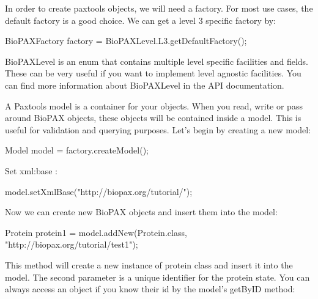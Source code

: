 \documentclass{tufte-book}
\begin{document}
In order to create paxtools objects, we will need a factory. For most use cases, the default factory is a good choice. We can get a level 3 specific factory by:

\begin{javacode}
BioPAXFactory factory = BioPAXLevel.L3.getDefaultFactory();
\end{javacode}

BioPAXLevel is an enum that contains multiple level specific facilities and fields. These can be very useful if you want to implement level agnostic facilities. You can find more information about BioPAXLevel in the API documentation.

A Paxtools model is a container for your objects. When you read, write or pass around BioPAX objects, these objects will be contained inside a model. This is useful for validation and querying purposes. 
Let's begin by creating a new model:


\begin{javacode}
Model model = factory.createModel();
\end{javacode}

Set xml:base :

\begin{javacode}
model.setXmlBase("http://biopax.org/tutorial/");
\end{javacode}

Now we can create new BioPAX objects and insert them into the model:

\begin{javacode}
Protein protein1 = model.addNew(Protein.class, 
	"http://biopax.org/tutorial/test1"); 
\end{javacode}

This method will create a new instance of protein class and insert it into the model. The second parameter is a unique identifier for the  protein state.  You can always access an object if you know their id by the model's getByID method:
\end{document}
